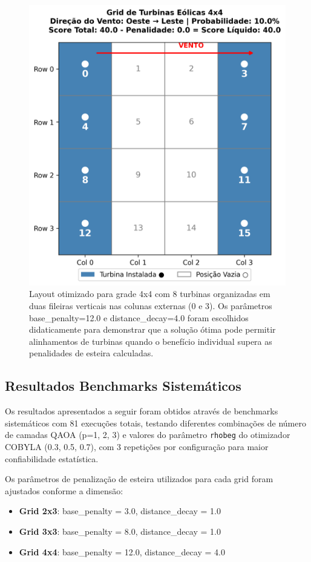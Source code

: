 \documentclass{weciq}
\begin{document}
\begin{figure}[h!]
\centering
\includegraphics[width=0.85\linewidth]{grid_visualization_4x4_4x4_8turbinas_20250810_124433.png}
\caption{Layout otimizado para grade 4x4 com 8 turbinas organizadas em duas fileiras verticais nas colunas externas (0 e 3). Os parâmetros base\_penalty=12.0 e distance\_decay=4.0 foram escolhidos didaticamente para demonstrar que a solução ótima pode permitir alinhamentos de turbinas quando o benefício individual supera as penalidades de esteira calculadas.}
\end{figure}

\subsection*{Resultados Benchmarks Sistemáticos}

Os resultados apresentados a seguir foram obtidos através de benchmarks sistemáticos com 81 execuções totais, testando diferentes combinações de número de camadas QAOA (p=1, 2, 3) e valores do parâmetro \texttt{rhobeg} do otimizador COBYLA (0.3, 0.5, 0.7), com 3 repetições por configuração para maior confiabilidade estatística.

Os parâmetros de penalização de esteira utilizados para cada grid foram ajustados conforme a dimensão:
\begin{itemize}
\item \textbf{Grid 2x3}: base\_penalty = 3.0, distance\_decay = 1.0
\item \textbf{Grid 3x3}: base\_penalty = 8.0, distance\_decay = 1.0  
\item \textbf{Grid 4x4}: base\_penalty = 12.0, distance\_decay = 4.0
\end{itemize}
\end{document}
